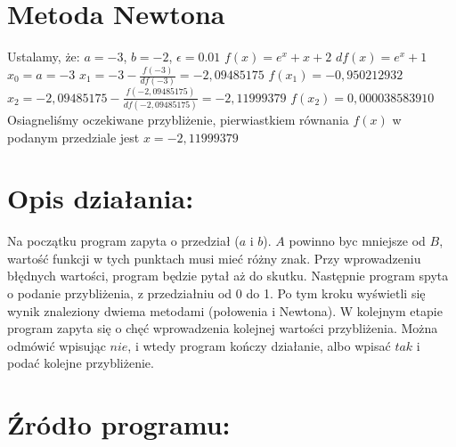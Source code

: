 \documentclass[11pt]{article}
\begin{document}
\section*{Metoda Newtona}
Ustalamy, że: $a = -3$, $b = -2$, $\epsilon = 0.01$\newline
$f(x) = e^{x} + x + 2$\newline
$df(x) = e^{x} + 1$\newline
$x_{0} = a = -3$\newline
$x_{1} = -3 - \frac{f(-3)}{df(-3)} = -2,09485175$\newline
$f(x_{1}) = -0,950212932$\newline
$x_{2} = -2,09485175 - \frac{f(-2,09485175)}{df(-2,09485175)} = -2,11999379$\newline
$f(x_{2}) = 0,000038583910$\newline
\newline
Osiagneliśmy oczekiwane przybliżenie, pierwiastkiem równania $f(x)$ w podanym przedziale jest $x= -2,11999379$

\section{Opis działania:} 
Na początku program zapyta o przedział ($a$ i $b$). $A$ powinno byc mniejsze od $B$, wartość funkcji w tych punktach musi mieć różny znak. Przy wprowadzeniu błędnych wartości, program będzie pytał aż do skutku. Następnie program spyta o podanie przybliżenia, z przedziałniu od 0 do 1. Po tym kroku wyświetli się wynik znaleziony dwiema metodami (połowenia i Newtona). W kolejnym etapie program zapyta się o chęć wprowadzenia kolejnej wartości przybliżenia. Można odmówić wpisując $nie$, i wtedy program kończy działanie, albo wpisać $tak$ i podać kolejne przybliżenie.

\section{Źródło programu:}
\end{document}
